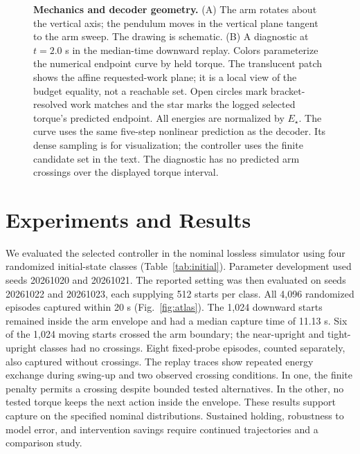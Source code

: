 \documentclass[letterpaper,10pt,conference]{ieeeconf}
\newcommand{\Estar}{E_{\star}}
\begin{document}
\begin{figure}[t]

\caption{\textbf{Mechanics and decoder geometry.} (A) The arm rotates about the vertical axis; the pendulum moves in the vertical plane tangent to the arm sweep. The drawing is schematic. (B) A diagnostic at $t=2.0$ s in the median-time downward replay. Colors parameterize the numerical endpoint curve by held torque. The translucent patch shows the affine requested-work plane; it is a local view of the budget equality, not a reachable set. Open circles mark bracket-resolved work matches and the star marks the logged selected torque's predicted endpoint. All energies are normalized by $\Estar$. The curve uses the same five-step nonlinear prediction as the decoder. Its dense sampling is for visualization; the controller uses the finite candidate set in the text. The diagnostic has no predicted arm crossings over the displayed torque interval.}
\label{fig:method}
\end{figure}

\section{Experiments and Results}
We evaluated the selected controller in the nominal lossless simulator using four randomized initial-state classes (Table~\ref{tab:initial}). Parameter development used seeds 20261020 and 20261021. The reported setting was then evaluated on seeds 20261022 and 20261023, each supplying 512 starts per class. All 4,096 randomized episodes captured within 20 s (Fig.~\ref{fig:atlas}). The 1,024 downward starts remained inside the arm envelope and had a median capture time of 11.13 s. Six of the 1,024 moving starts crossed the arm boundary; the near-upright and tight-upright classes had no crossings. Eight fixed-probe episodes, counted separately, also captured without crossings. The replay traces show repeated energy exchange during swing-up and two observed crossing conditions. In one, the finite penalty permits a crossing despite bounded tested alternatives. In the other, no tested torque keeps the next action inside the envelope. These results support capture on the specified nominal distributions. Sustained holding, robustness to model error, and intervention savings require continued trajectories and a comparison study.
\end{document}
